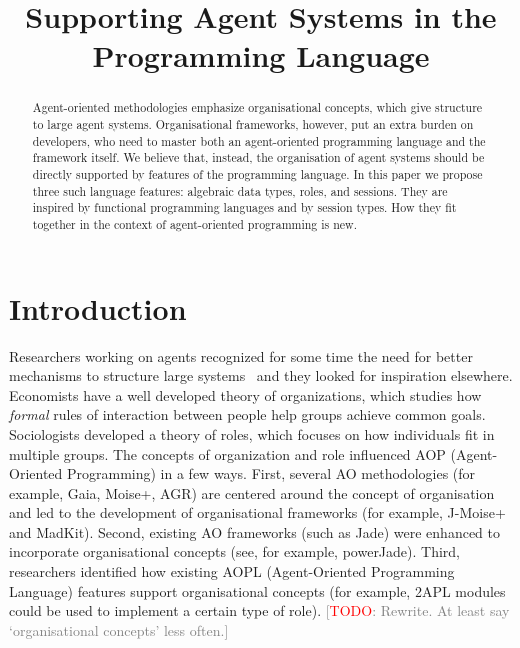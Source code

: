 \documentclass[conference,compsoc]{IEEEtran} %
\title{Supporting Agent Systems in the Programming Language}
\author{
  \IEEEauthorblockN{Claudia Grigore and Rem Collier} 
  \IEEEauthorblockA{
    School of Computer Science and Informatics\\
    University College Dublin\\
    Belfield Campus, Dublin~4, Ireland\\
    Email: claudia.grigore@ucdconnect.ie, rem.collier@ucd.ie}}
\newcommand{\todo}[1]{{\small \textcolor{gray}{[\textcolor{red}{TODO}: #1]}}}
\begin{document}
\maketitle
\begin{abstract} %

Agent-oriented methodologies emphasize organisational concepts, which give
structure to large agent systems. Organisational frameworks, however, put
an extra burden on developers, who need to master both an agent-oriented
programming language and the framework itself. We believe that, instead,
the organisation of agent systems should be directly supported by features
of the programming language. In this paper we propose three such language
features: algebraic data types, roles, and sessions.  They are inspired by
functional programming languages and by session types.  How they fit
together in the context of agent-oriented programming is new.

\end{abstract} %
\section{Introduction} %


Researchers working on agents recognized for some time the need for better
mechanisms to structure large systems~\cite{todo} and they looked for
inspiration elsewhere. Economists have a well developed theory of
organizations, which studies how \emph{formal} rules of interaction between
people help groups achieve common goals. Sociologists developed a theory of
roles, which focuses on how individuals fit in multiple groups. The
concepts of organization and role influenced AOP (Agent-Oriented
Programming) in a few ways. First, several AO methodologies (for example,
Gaia, Moise+, AGR) are centered around the concept of organisation and led
to the development of organisational frameworks (for example, J-Moise+ and
MadKit). Second, existing AO frameworks (such as Jade) were enhanced to
incorporate organisational concepts (see, for example, powerJade). Third,
researchers identified how existing AOPL (Agent-Oriented Programming
Language) features support organisational concepts (for example, 2APL
modules could be used to implement a certain type of role). \todo{Rewrite.
At least say `organisational concepts' less often.}
\end{document}
